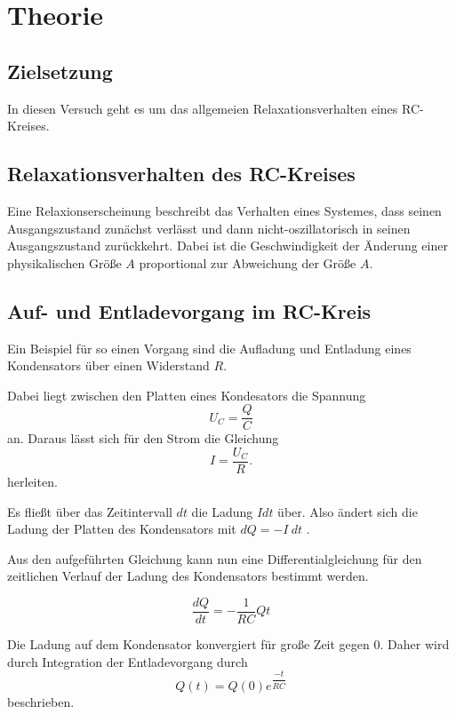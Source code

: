 \section{Theorie}
\label{sec:Theorie}

\subsection{Zielsetzung}
In diesen Versuch geht es um das allgemeien Relaxationsverhalten eines RC-Kreises.

\subsection{Relaxationsverhalten des RC-Kreises}
Eine Relaxionserscheinung beschreibt das Verhalten eines Systemes, dass seinen Ausgangszustand zunächst verlässt und 
dann nicht-oszillatorisch in seinen Ausgangszustand zurückkehrt.
Dabei ist die Geschwindigkeit der Änderung einer physikalischen Größe $A$ proportional zur 
Abweichung der Größe $A$.


\subsection{Auf- und Entladevorgang im RC-Kreis}
Ein Beispiel für so einen Vorgang sind die Aufladung und Entladung eines Kondensators über einen 
Widerstand $R$.

Dabei liegt zwischen den Platten eines Kondesators die Spannung 
    \begin{equation}
        \label{eq:sp}
        U_C = \dfrac{Q}{C}
    \end{equation} 
\noindent an.
Daraus lässt sich für den Strom die Gleichung 
   \begin{equation}
       \label{eq:st}
       I = \dfrac{U_C}{R}.
   \end{equation}
\noindent herleiten.

\noindent Es fließt über das Zeitintervall $dt$ die Ladung $I dt$ über. Also ändert sich die Ladung der Platten
des Kondensators mit $dQ=-I\ dt$ .

\noindent Aus den aufgeführten Gleichung kann nun eine Differentialgleichung für den zeitlichen 
Verlauf der Ladung des Kondensators bestimmt werden.

\begin{equation}
    \dfrac{dQ}{dt}= -\dfrac{1}{RC} Q{t}
\end{equation}

\noindent Die Ladung auf dem Kondensator konvergiert für große Zeit gegen 0. Daher wird durch 
Integration der Entladevorgang durch 
\begin{equation}
    \label{eq:dgl}
    Q(t)=Q(0)e^{\dfrac{-t}{RC}}
\end{equation}
\noindent beschrieben.


